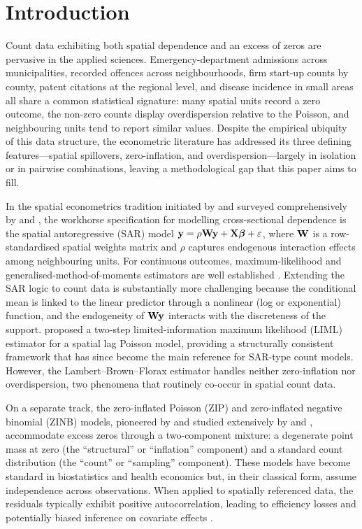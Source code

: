 \section{Introduction}\label{sec:introduction}

Count data exhibiting both spatial dependence and an excess of zeros are pervasive in the applied sciences.
Emergency-department admissions across municipalities, recorded offences across neighbourhoods, firm start-up counts by county, patent citations at the regional level, and disease incidence in small areas all share a common statistical signature: many spatial units record a zero outcome, the non-zero counts display overdispersion relative to the Poisson, and neighbouring units tend to report similar values.
Despite the empirical ubiquity of this data structure, the econometric literature has addressed its three defining features---spatial spillovers, zero-inflation, and overdispersion---largely in isolation or in pairwise combinations, leaving a methodological gap that this paper aims to fill.

In the spatial econometrics tradition initiated by \citet{anselin1988} and surveyed comprehensively by \citet{lesage_pace2009} and \citet{arbia2006,arbia2024}, the workhorse specification for modelling cross-sectional dependence is the spatial autoregressive (SAR) model $\mathbf{y} = \rho\mathbf{W}\mathbf{y} + \mathbf{X}\boldsymbol{\beta} + \varepsilon$, where $\mathbf{W}$ is a row-standardised spatial weights matrix and $\rho$ captures endogenous interaction effects among neighbouring units.
For continuous outcomes, maximum-likelihood and generalised-method-of-moments estimators are well established \citep{lee2004,kelejian_prucha1998,kelejian_prucha1999}.
Extending the SAR logic to count data is substantially more challenging because the conditional mean is linked to the linear predictor through a nonlinear (log or exponential) function, and the endogeneity of $\mathbf{W}\mathbf{y}$ interacts with the discreteness of the support.
\citet{lambert2010} proposed a two-step limited-information maximum likelihood (LIML) estimator for a spatial lag Poisson model, providing a structurally consistent framework that has since become the main reference for SAR-type count models.
However, the Lambert--Brown--Florax estimator handles neither zero-inflation nor overdispersion, two phenomena that routinely co-occur in spatial count data.

On a separate track, the zero-inflated Poisson (ZIP) and zero-inflated negative binomial (ZINB) models, pioneered by \citet{lambert1992} and studied extensively by \citet{cameron_trivedi2013} and \citet{hilbe2011}, accommodate excess zeros through a two-component mixture: a degenerate point mass at zero (the ``structural'' or ``inflation'' component) and a standard count distribution (the ``count'' or ``sampling'' component).
These models have become standard in biostatistics and health economics but, in their classical form, assume independence across observations.
When applied to spatially referenced data, the residuals typically exhibit positive autocorrelation, leading to efficiency losses and potentially biased inference on covariate effects \citep{arbia2006}.


